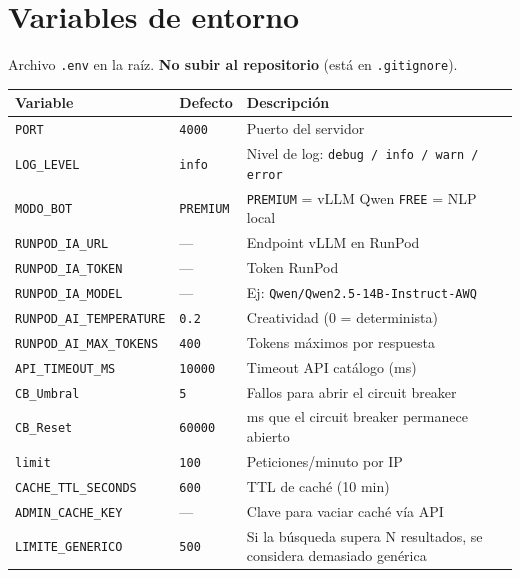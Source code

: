 \documentclass[12pt, a4paper]{article}
\begin{document}
\section{Variables de entorno}

Archivo \texttt{.env} en la raíz. \textbf{No subir al repositorio} (está en \texttt{.gitignore}).

\begin{center}
\renewcommand{\arraystretch}{1.2}
\begin{tabularx}{\textwidth}{llX}
\toprule
\textbf{Variable} & \textbf{Defecto} & \textbf{Descripción} \\
\midrule
\texttt{PORT}                    & \texttt{4000}    & Puerto del servidor \\
\texttt{LOG\_LEVEL}              & \texttt{info}    & Nivel de log: \texttt{debug / info / warn / error} \\
\texttt{MODO\_BOT}               & \texttt{PREMIUM} & \texttt{PREMIUM} = vLLM Qwen \quad \texttt{FREE} = NLP local \\
\texttt{RUNPOD\_IA\_URL}         & ---              & Endpoint vLLM en RunPod \\
\texttt{RUNPOD\_IA\_TOKEN}       & ---              & Token RunPod \\
\texttt{RUNPOD\_IA\_MODEL}       & ---              & Ej: \texttt{Qwen/Qwen2.5-14B-Instruct-AWQ} \\
\texttt{RUNPOD\_AI\_TEMPERATURE} & \texttt{0.2}     & Creatividad (0 = determinista) \\
\texttt{RUNPOD\_AI\_MAX\_TOKENS} & \texttt{400}     & Tokens máximos por respuesta \\
\texttt{API\_TIMEOUT\_MS}        & \texttt{10000}   & Timeout API catálogo (ms) \\
\texttt{CB\_Umbral}              & \texttt{5}       & Fallos para abrir el circuit breaker \\
\texttt{CB\_Reset}               & \texttt{60000}   & ms que el circuit breaker permanece abierto \\
\texttt{limit}                   & \texttt{100}     & Peticiones/minuto por IP \\
\texttt{CACHE\_TTL\_SECONDS}     & \texttt{600}     & TTL de caché (10 min) \\
\texttt{ADMIN\_CACHE\_KEY}       & ---              & Clave para vaciar caché vía API \\
\texttt{LIMITE\_GENERICO}        & \texttt{500}     & Si la búsqueda supera N resultados, se considera demasiado genérica \\
\bottomrule
\end{tabularx}
\end{center}
\end{document}
